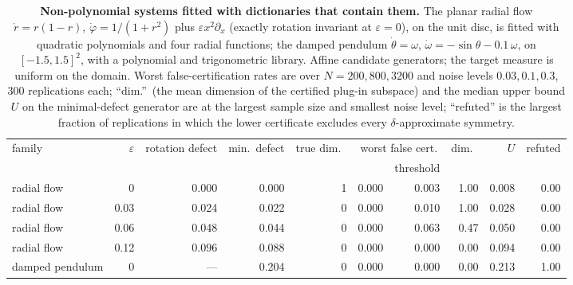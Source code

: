 \begin{table}[!htbp]
\centering\small
\begin{adjustbox}{max width=\textwidth, max totalheight=0.9\textheight}
\begin{tabular}{lrrrrrrrrr}
\toprule
family & $\varepsilon$ & rotation defect & min.\ defect & true dim.\ & \multicolumn{2}{c}{worst false cert.} & dim.\ & $U$ & refuted \\
\cmidrule(lr){6-7}
 & & & & & \symcert{} & threshold & & & \\
\midrule
radial flow & 0 & 0.000 & 0.000 & 1 & 0.000 & 0.003 & 1.00 & 0.008 & 0.00 \\
radial flow & 0.03 & 0.024 & 0.022 & 0 & 0.000 & 0.010 & 1.00 & 0.028 & 0.00 \\
radial flow & 0.06 & 0.048 & 0.044 & 0 & 0.000 & 0.063 & 0.47 & 0.050 & 0.00 \\
radial flow & 0.12 & 0.096 & 0.088 & 0 & 0.000 & 0.000 & 0.00 & 0.094 & 0.00 \\
damped pendulum & 0 & --- & 0.204 & 0 & 0.000 & 0.000 & 0.00 & 0.213 & 1.00 \\
\bottomrule
\end{tabular}
\end{adjustbox}
\caption{\textbf{Non-polynomial systems fitted with dictionaries that contain them.} The planar radial flow $\dot r = r(1-r)$, $\dot\varphi = 1/(1+r^2)$ plus $\varepsilon x^2\partial_x$ (exactly rotation invariant at $\varepsilon = 0$), on the unit disc, is fitted with quadratic polynomials and four radial functions; the damped pendulum $\dot\theta = \omega$, $\dot\omega = -\sin\theta - 0.1\,\omega$, on $[-1.5, 1.5]^2$, with a polynomial and trigonometric library. Affine candidate generators; the target measure is uniform on the domain. Worst false-certification rates are over $N = 200, 800, 3200$ and noise levels $0.03, 0.1, 0.3$, 300 replications each; ``dim.''\ (the mean dimension of the certified plug-in subspace) and the median upper bound $U$ on the minimal-defect generator are at the largest sample size and smallest noise level; ``refuted'' is the largest fraction of replications in which the lower certificate excludes every $\delta$-approximate symmetry.}
\label{stab:dictionary}
\end{table}

